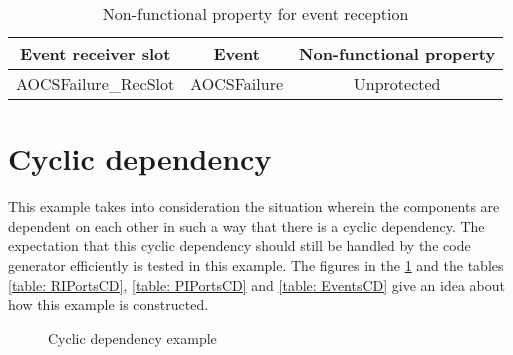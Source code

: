 \begin{table}[H]
	\centering
	\caption{Non-functional property for event reception}
	\label{table: EventsCC}
	\begin{tabular}{|c|c|c|}
		\hline
		\textbf{Event receiver slot} & \textbf{Event} & \textbf{Non-functional property} \\ \hline
		AOCSFailure\_RecSlot & AOCSFailure & Unprotected \\ \hline
	\end{tabular}
\end{table}

\section{Cyclic dependency}
This example takes into consideration the situation wherein the components are dependent on each other in such a way that there is a cyclic dependency. The expectation that this cyclic dependency should still be handled by the code generator efficiently is tested in this example. The figures in the \cref{fig: FiguresCD} and the tables \cref{table: RIPortsCD}, \cref{table: PIPortsCD} and \cref{table: EventsCD} give an idea about how this example is constructed.

\begin{figure}[h]
	\centering
	\hfill
	\hfill
	\label{fig: FiguresCD}
	\caption{Cyclic dependency example}
\end{figure}

